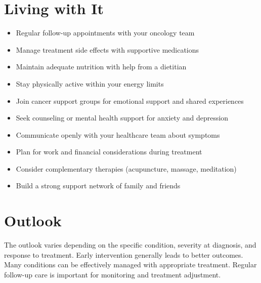 \section{Living with It}
\begin{itemize}[noitemsep]
  \item Regular follow-up appointments with your oncology team
  \item Manage treatment side effects with supportive medications
  \item Maintain adequate nutrition with help from a dietitian
  \item Stay physically active within your energy limits
  \item Join cancer support groups for emotional support and shared experiences
  \item Seek counseling or mental health support for anxiety and depression
  \item Communicate openly with your healthcare team about symptoms
  \item Plan for work and financial considerations during treatment
  \item Consider complementary therapies (acupuncture, massage, meditation)
  \item Build a strong support network of family and friends
\end{itemize}
\section{Outlook}
The outlook varies depending on the specific condition, severity at diagnosis, and response to treatment. Early intervention generally leads to better outcomes. Many conditions can be effectively managed with appropriate treatment. Regular follow-up care is important for monitoring and treatment adjustment.
